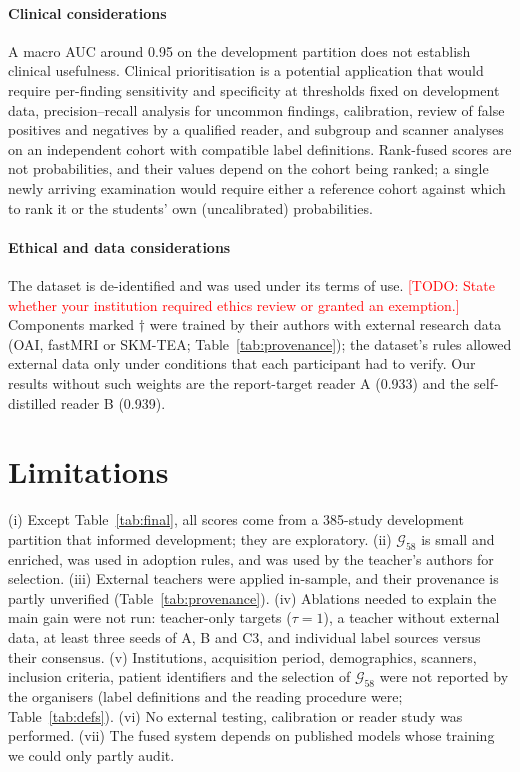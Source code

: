 \documentclass{ieeeaccess}
\newcommand{\TODO}[1]{\textcolor{red}{[TODO: #1]}}
\newcommand{\gold}{$\mathcal{G}_{58}$}
\begin{document}
\paragraph*{Clinical considerations} A macro AUC around 0.95 on the development partition does not establish clinical
usefulness. Clinical prioritisation is a potential application that would require per-finding sensitivity and specificity
at thresholds fixed on development data, precision--recall analysis for uncommon findings, calibration, review of false
positives and negatives by a qualified reader, and subgroup and scanner analyses on an independent cohort with compatible
label definitions. Rank-fused scores are not probabilities, and their values depend on the cohort being ranked; a single
newly arriving examination would require either a reference cohort against which to rank it or the students' own
(uncalibrated) probabilities.

\paragraph*{Ethical and data considerations}
\label{sec:ethics}
The dataset is de-identified and was used under its terms of use. \TODO{State whether your institution required ethics
review or granted an exemption.} Components marked $\dagger$ were trained by their authors with external research data
(OAI, fastMRI or SKM-TEA; Table~\ref{tab:provenance}); the dataset's rules allowed external data only under conditions that
each participant had to verify. Our results without such weights are the report-target reader A (0.933) and the
self-distilled reader B (0.939).

\section{Limitations}
\label{sec:limitations}
(i) Except Table~\ref{tab:final}, all scores come from a 385-study development partition that informed development; they
are exploratory. (ii) \gold{} is small and enriched, was used in adoption rules, and was used by the teacher's authors for
selection. (iii) External teachers were applied in-sample, and their provenance is partly unverified
(Table~\ref{tab:provenance}). (iv) Ablations needed to explain the main gain were not run: teacher-only targets ($\tau=1$), a
teacher without external data, at least three seeds of A, B and C3, and individual label sources versus their consensus.
(v) Institutions, acquisition period, demographics, scanners, inclusion criteria, patient identifiers and the
selection of \gold{} were not reported by the organisers (label definitions and the reading procedure were;
Table~\ref{tab:defs}). (vi) No external testing,
calibration or reader study was performed. (vii) The fused system depends on published models whose training we could
only partly audit.
\end{document}
